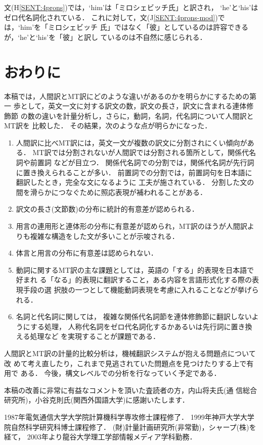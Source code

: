 文(H\ref{SENT:4prons})では，`him'は「ミロシェビッチ氏」と訳され，
`he'と`his'はゼロ代名詞化されている．
これに対して，文(J\ref{SENT:4prons-mod})では，`him'を「ミロシェビッチ
氏」ではなく「彼」としているのは許容できるが，`he'と`his'を「彼」と訳し
ているのは不自然に感じられる．


\section{おわりに}
\label{sec:conc}

本稿では，人間訳とMT訳にどのような違いがあるのかを明らかにするための第一
歩として，英文一文に対する訳文の数，訳文の長さ，訳文に含まれる連体修飾節
の数の違いを計量分析し，さらに，動詞，名詞，代名詞について人間訳とMT訳を
比較した．
その結果，次のような点が明らかになった．
\begin{enumerate}
\item
人間訳に比べMT訳には，英文一文が複数の訳文に分割されにくい傾向がある．
MT訳では分割されないが人間訳では分割される箇所として，関係代名詞や前置詞
などが目立つ．
関係代名詞での分割では，関係代名詞が先行詞に置き換えられることが多い．
前置詞での分割では，前置詞句を日本語に翻訳したとき，完全な文になるように
工夫が施されている．
分割した文の間を滑らかにつなぐために照応表現が補われることがある．
\item
訳文の長さ(文節数)の分布に統計的有意差が認められる．
\item
用言の連用形と連体形の分布に有意差が認められ，MT訳のほうが人間訳よ
りも複雑な構造をした文が多いことが示唆される．
\item
体言と用言の分布に有意差は認められない．
\item
動詞に関するMT訳の主な課題としては，英語の「する」的表現を日本語で好まれ
る「なる」的表現に翻訳すること，ある内容を言語形式化する際の表現手段の選
択肢の一つとして機能動詞表現を考慮に入れることなどが挙げられる．
\item
名詞と代名詞に関しては，
複雑な関係代名詞節を連体修飾節に翻訳しないようにする処理，
人称代名詞をゼロ代名詞化するかあるいは先行詞に置き換える処理など
を実現することが課題である．
\end{enumerate}

人間訳とMT訳の計量的比較分析は，機械翻訳システムが抱える問題点について改
めて考え直したり，これまで見逃されていた問題点を見つけたりする上で有用で
ある．
今後，構文レベルでの分析を行なっていく予定である．

\acknowledgment
本稿の改善に非常に有益なコメントを頂いた査読者の方，内山将夫氏(通
信総合研究所)，小谷克則氏(関西外国語大学)に感謝いたします． 




\begin{biography}
{1987年電気通信大学大学院計算機科学専攻修士課程修了．
1999年神戸大学大学院自然科学研究科博士課程修了．
(財)計量計画研究所(非常勤)，シャープ(株)を経て，
2003年より龍谷大学理工学部情報メディア学科勤務．
} 

\end{biography}


